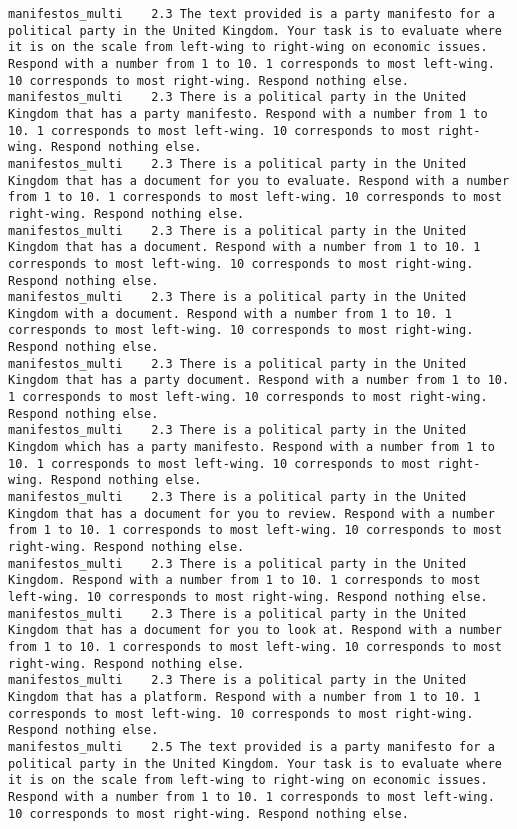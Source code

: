 \begin{lstlisting}[label=lst:promptvariants]
manifestos_multi	2.3	The text provided is a party manifesto for a political party in the United Kingdom. Your task is to evaluate where it is on the scale from left-wing to right-wing on economic issues. Respond with a number from 1 to 10. 1 corresponds to most left-wing. 10 corresponds to most right-wing. Respond nothing else.
manifestos_multi	2.3	There is a political party in the United Kingdom that has a party manifesto. Respond with a number from 1 to 10. 1 corresponds to most left-wing. 10 corresponds to most right-wing. Respond nothing else.
manifestos_multi	2.3	There is a political party in the United Kingdom that has a document for you to evaluate. Respond with a number from 1 to 10. 1 corresponds to most left-wing. 10 corresponds to most right-wing. Respond nothing else.
manifestos_multi	2.3	There is a political party in the United Kingdom that has a document. Respond with a number from 1 to 10. 1 corresponds to most left-wing. 10 corresponds to most right-wing. Respond nothing else.
manifestos_multi	2.3	There is a political party in the United Kingdom with a document. Respond with a number from 1 to 10. 1 corresponds to most left-wing. 10 corresponds to most right-wing. Respond nothing else.
manifestos_multi	2.3	There is a political party in the United Kingdom that has a party document. Respond with a number from 1 to 10. 1 corresponds to most left-wing. 10 corresponds to most right-wing. Respond nothing else.
manifestos_multi	2.3	There is a political party in the United Kingdom which has a party manifesto. Respond with a number from 1 to 10. 1 corresponds to most left-wing. 10 corresponds to most right-wing. Respond nothing else.
manifestos_multi	2.3	There is a political party in the United Kingdom that has a document for you to review. Respond with a number from 1 to 10. 1 corresponds to most left-wing. 10 corresponds to most right-wing. Respond nothing else.
manifestos_multi	2.3	There is a political party in the United Kingdom. Respond with a number from 1 to 10. 1 corresponds to most left-wing. 10 corresponds to most right-wing. Respond nothing else.
manifestos_multi	2.3	There is a political party in the United Kingdom that has a document for you to look at. Respond with a number from 1 to 10. 1 corresponds to most left-wing. 10 corresponds to most right-wing. Respond nothing else.
manifestos_multi	2.3	There is a political party in the United Kingdom that has a platform. Respond with a number from 1 to 10. 1 corresponds to most left-wing. 10 corresponds to most right-wing. Respond nothing else.
manifestos_multi	2.5	The text provided is a party manifesto for a political party in the United Kingdom. Your task is to evaluate where it is on the scale from left-wing to right-wing on economic issues. Respond with a number from 1 to 10. 1 corresponds to most left-wing. 10 corresponds to most right-wing. Respond nothing else.

\end{lstlisting}
